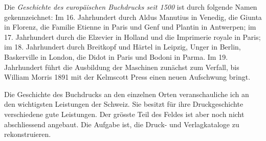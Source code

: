 \documentclass[a4paper,
fontsize=11pt,
oneside,
numbers=noperiodatend,
parskip=half-,
bibliography=totoc,
final
]{scrartcl}
\begin{document}
Die \emph{Geschichte des europäischen Buchdrucks seit 1500} ist durch
folgende Namen gekennzeichnet: Im 16. Jahrhundert durch Aldus Manutius
in Venedig, die Giunta in Florenz, die Familie Etienne in Paris und Genf
und Plantin in Antwerpen; im 17. Jahrhundert durch die Elzevier in
Holland und die Imprimerie royale in Paris; im 18. Jahrhundert durch
Breitkopf und Härtel in Leipzig, Unger in Berlin, Baskerville in London,
die Didot in Paris und Bodoni in Parma. Im 19. Jahrhundert führt die
Ausbildung der Maschinen zunächst zum Verfall, bis William Morris 1891
mit der Kelmscott Press einen neuen Aufschwung bringt.

Die Geschichte des Buchdrucks an den einzelnen Orten veranschauliche ich
an den wichtigsten Leistungen der Schweiz. Sie besitzt für ihre
Druckgeschichte verschiedene gute Leistungen. Der grösste Teil des
Feldes ist aber noch nicht abschliessend angebaut. Die Aufgabe ist, die
Druck- und Verlagkataloge zu rekonstruieren.
\end{document}
